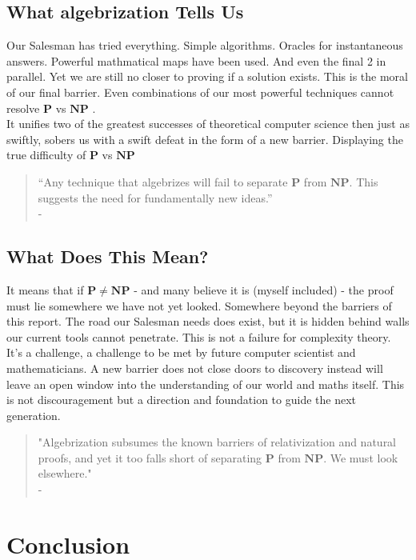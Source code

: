 \documentclass[12pt]{report}
\begin{document}
\section{What algebrization Tells Us}
Our Salesman has tried everything.
Simple algorithms.
Oracles for instantaneous answers.
Powerful mathmatical maps have been used.
And even the final 2 in parallel.
Yet we are still no closer to proving if a solution exists.
This is the moral of our final barrier.
Even combinations of our most powerful techniques cannot resolve $\mathbf{P}$ vs $\mathbf{NP}$ \citep{arora2008algebrization, arora2009}.\\
\vspace{0.3cm}
It unifies two of the greatest successes of theoretical computer science then just as swiftly, sobers us with a swift defeat in the form of a new barrier.
Displaying the true difficulty of $\mathbf{P}$ vs $\mathbf{NP}$
\begin{quote}
    “Any technique that algebrizes will fail to separate $\mathbf{P}$ from $\mathbf{NP}$. This suggests the need for fundamentally new ideas.”\\
    - \cite[Ch. 20.4]{arora2009}
\end{quote}
\vspace{0.3cm}

\section{What Does This Mean?}
It means that if $\mathbf{P \ne NP}$ - and many believe it is (myself included) - the proof must lie somewhere we have not yet looked.
Somewhere beyond the barriers of this report.
The road our Salesman needs does exist, but it is hidden behind walls our current tools cannot penetrate.
This is not a failure for complexity theory.
It's a challenge, a challenge to be met by future computer scientist and mathematicians.
A new barrier does not close doors to discovery instead will leave an open window into the understanding of our world and maths itself.
This is not discouragement but a direction and foundation to guide the next generation.
\begin{quote}
    "Algebrization subsumes the known barriers of relativization and natural proofs, and yet it too falls short of separating $\mathbf{P}$ from $\mathbf{NP}$. We must look elsewhere."\\
    -\cite{arora2008algebrization}
\end{quote}

\newpage
\chapter{Conclusion}
\end{document}
